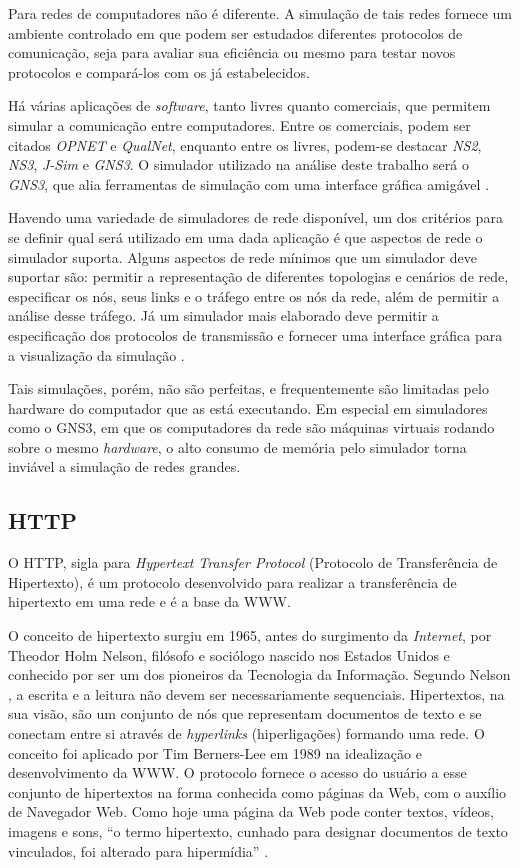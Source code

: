 Para redes de computadores não é diferente. A simulação de tais redes fornece um ambiente controlado em que podem ser estudados diferentes protocolos de comunicação, seja para avaliar sua eficiência ou mesmo para testar novos protocolos e compará-los com os já estabelecidos.

Há várias aplicações de \textit{software}, tanto livres quanto comerciais, que permitem simular a comunicação entre computadores. Entre os comerciais, podem ser citados \textit{OPNET} e \textit{QualNet}, enquanto entre os livres, podem-se destacar \textit{NS2}, \textit{NS3}, \textit{J-Sim} e \textit{GNS3}. O simulador utilizado na análise deste trabalho será o \textit{GNS3}, que alia ferramentas de simulação com uma interface gráfica amigável \cite{redesSim}.

Havendo uma variedade de simuladores de rede disponível, um dos critérios para se definir qual será utilizado em uma dada aplicação é que aspectos de rede o simulador suporta. Alguns aspectos de rede mínimos que um simulador deve suportar são: permitir a representação de diferentes topologias e cenários de rede, especificar os nós, seus links e o tráfego entre os nós da rede, além de permitir a análise desse tráfego. Já um simulador mais elaborado deve permitir a especificação dos protocolos de transmissão e fornecer uma interface gráfica para a visualização da simulação \cite{redesSim}.

Tais simulações, porém, não são perfeitas, e frequentemente são limitadas pelo hardware do computador que as está executando. Em especial em simuladores como o GNS3, em que os computadores da rede são máquinas virtuais rodando sobre o mesmo \textit{hardware}, o alto consumo de memória pelo simulador torna inviável a simulação de redes grandes.

\subsection{HTTP}
O HTTP, sigla para \textit{Hypertext Transfer Protocol} (Protocolo de Transferência de Hipertexto), é um protocolo desenvolvido para realizar a transferência de hipertexto em uma rede e é a base da WWW.

O conceito de hipertexto surgiu em 1965, antes do surgimento da \textit{Internet}, por Theodor Holm Nelson, filósofo e sociólogo nascido nos Estados Unidos e conhecido por ser um dos pioneiros da Tecnologia da Informação. Segundo Nelson \cite{theodorenelson1981}, a escrita e a leitura não devem ser necessariamente sequenciais. Hipertextos, na sua visão, são um conjunto de nós que representam documentos de texto e se conectam entre si através de \textit{hyperlinks} (hiperligações) formando uma rede. O conceito foi aplicado por Tim Berners-Lee em 1989 na idealização e desenvolvimento da WWW. O protocolo fornece o acesso do usuário a esse conjunto de hipertextos na forma conhecida como páginas da Web, com o auxílio de Navegador Web. Como hoje uma página da Web pode conter textos, vídeos, imagens e sons, “o termo hipertexto, cunhado para designar documentos de texto vinculados, foi alterado para hipermídia”  \cite{behrouza.forouzan2013}.

